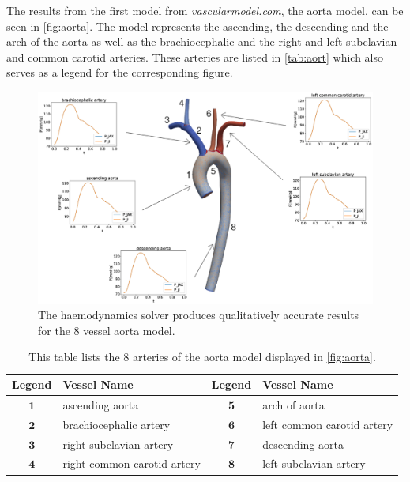 \documentclass[a4paper, oneside]{discothesis}
\begin{document}
The results from the first model from \emph{vascularmodel.com}, the aorta model, can be seen in \autoref{fig:aorta}.
The model represents the ascending, the descending and the arch of the aorta as well as the brachiocephalic and the right and left subclavian and common carotid arteries.
These arteries are listed in \autoref{tab:aort} which also serves as a legend for the corresponding figure.
\begin{figure} [H]
	\centering
	\includegraphics[width=0.8\columnwidth]{figures/0007.eps}
	\caption{The haemodynamics solver produces qualitatively accurate results for the 8 vessel aorta model.}
	\label{fig:aorta}
\end{figure}
\begin{table}[H] 
	\begin{center}
		\begin{tabular}{|c|l|c|l|} 
			\hline
			Legend & Vessel Name &Legend & Vessel Name\\
			\hline
			$\mathbf{1}$& ascending aorta &
			$\mathbf{5}$& arch of aorta \\
			$\mathbf{2}$& brachiocephalic artery &
			$\mathbf{6}$& left common carotid artery \\
			$\mathbf{3}$& right subclavian artery &
			$\mathbf{7}$& descending aorta \\
			$\mathbf{4}$& right common carotid artery &
			$\mathbf{8}$& left subclavian artery \\
			\hline
		\end{tabular}
	\end{center}
	\caption{This table lists the 8 arteries of the aorta model displayed in \autoref{fig:aorta}.}
	\label{tab:aort}
\end{table}
\end{document}
